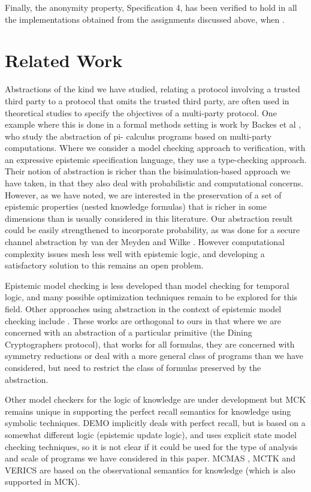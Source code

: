 \documentclass[]{llncs}
\begin{document}
\begin{theorem}
Finally, the anonymity property, Specification 4, has been verified to hold in all the implementations obtained
from the assignments discussed above, when . 

\section{Related Work}\label{sec:related} 

Abstractions of the kind we have studied, relating a  protocol  
involving a trusted third party to a
protocol that omits the trusted third party, are often used in  
theoretical studies to specify the
objectives of a multi-party protocol. One example where this is done  
in a formal methods setting
is work by Backes et al \cite{BMM10}, who study the abstraction of pi- 
calculus programs based on
multi-party computations. Where we consider a model checking approach  
to verification, with an expressive epistemic 
specification language, they use a type-checking approach.  Their  
notion  of abstraction is richer than the bisimulation-based approach  
we have taken,
in that they also deal with probabilistic and computational concerns.
However, as we have noted, we are interested in the preservation of a  
set of epistemic
properties (nested knowledge formulas) that is richer in some  
dimensions than is usually considered in this literature.
Our abstraction result could be easily strengthened to incorporate  
probability, as was done for
a secure channel abstraction by van der Meyden and Wilke  
\cite{MeydenWilke07}.
However computational complexity issues mesh less well with
epistemic logic, and developing a satisfactory solution to this  
remains an open problem.

Epistemic model checking is less developed than model checking for  
temporal logic, and
many possible optimization techniques remain to be explored for this  
field. Other approaches
using abstraction in the context of epistemic model checking include
\cite{CohenDLR09,CohenDLQ09}. These works are orthogonal to ours in that
where we are concerned with an abstraction of a particular primitive  
(the Dining Cryptographers protocol), that works for all formulas,  
they are concerned with symmetry reductions or deal with a more  
general class of programs than we have considered,
but need to restrict the class of formulas preserved by the abstraction.

Other model checkers for the logic of knowledge are under development
but MCK remains unique in supporting the perfect recall semantics for  
knowledge
using symbolic techniques.  DEMO \cite{demo} implicitly deals with  
perfect recall,
but is based on a somewhat different logic (epistemic update logic),  
and uses explicit state model checking techniques,
so it is not clear if it could be used for the type of analysis
and scale of programs we have considered in this paper.
MCMAS \cite{mcmas}, MCTK \cite{mctk} and  VERICS \cite{verics} are  
based on the observational semantics
for knowledge (which is also supported in MCK).


\end{theorem}
\end{document}

